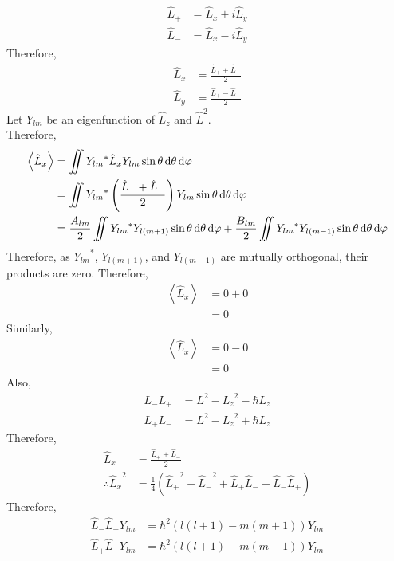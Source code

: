 \documentclass[titlepage, fleqn, a4paper, 12pt, twoside]{article}
\theoremstyle{definition}
\theoremstyle{theorem}
\begin{document}
\begin{align*}
	\hat{L}_+ &= \hat{L}_x + i \hat{L}_y\\
	\hat{L}_- &= \hat{L}_x - i \hat{L}_y
\end{align*}
Therefore,
\begin{align*}
	\hat{L}_x &= \frac{\hat{L}_+ + \hat{L}_-}{2}\\
	\hat{L}_y &= \frac{\hat{L}_+ - \hat{L}_-}{2}
\end{align*}
Let $Y_{l m}$ be an eigenfunction of $\hat{L}_z$ and $\hat{L}^2$.\\
Therefore,
\begin{align*}
	\left\langle \hat{L}_x \right\rangle &= \iint {Y_{l m}}^* \hat{L}_x Y_{l m} \sin \theta \dif \theta \dif \varphi\\
	&= \iint {Y_{l m}}^* \left( \frac{\hat{L}_+ + \hat{L}_-}{2} \right) Y_{l m} \sin \theta \dif \theta \dif \varphi\\
	&= \frac{A_{l m}}{2} \iint {Y_{l m}}^* Y_{l (m + 1)} \sin \theta \dif \theta \dif \varphi + \frac{B_{l m}}{2} \iint {Y_{l m}}^* Y_{l (m - 1)} \sin \theta \dif \theta \dif \varphi
\end{align*}
Therefore, as ${Y_{l m}}^*$, $Y_{l (m + 1)}$, and $Y_{l (m - 1)}$ are mutually orthogonal, their products are zero.
Therefore,
\begin{align*}
	\left\langle \hat{L}_x \right\rangle &= 0 + 0\\
	&= 0
\end{align*}
Similarly,
\begin{align*}
	\left\langle \hat{L}_x \right\rangle &= 0 - 0\\
	&= 0
\end{align*}
Also,
\begin{align*}
	L_- L_+ &= L^2 - {L_z}^2 - \hbar L_z\\
	L_+ L_- &= L^2 - {L_z}^2 + \hbar L_z
\end{align*}
Therefore,
\begin{align*}
	\hat{L}_x &= \frac{\hat{L}_+ + \hat{L}_-}{2}\\
	\therefore {\hat{L}_x}^2 &= \frac{1}{4} \left( {\hat{L}_+}^2 + {\hat{L}_-}^2 + \hat{L}_+ \hat{L}_- + \hat{L}_- \hat{L}_+ \right)
\end{align*}
Therefore,
\begin{align*}
	\hat{L}_- \hat{L}_+ Y_{l m} &= \hbar^2 \left( l (l + 1) - m (m + 1) \right) Y_{l m}\\
	\hat{L}_+ \hat{L}_- Y_{l m} &= \hbar^2 \left( l (l + 1) - m (m - 1) \right) Y_{l m}
\end{align*}
\end{document}
